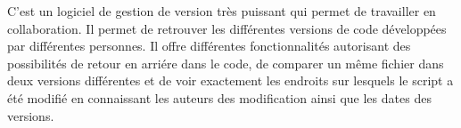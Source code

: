 


	C'est un logiciel de gestion de version très puissant qui permet de travailler en collaboration. Il permet de retrouver les différentes versions de code développées par différentes personnes. Il offre différentes fonctionnalités autorisant des possibilités de retour en arriére dans le code, de comparer un même fichier dans deux versions différentes et de voir exactement les endroits sur lesquels le script a été modifié en connaissant les auteurs des modification ainsi que les dates des versions.
